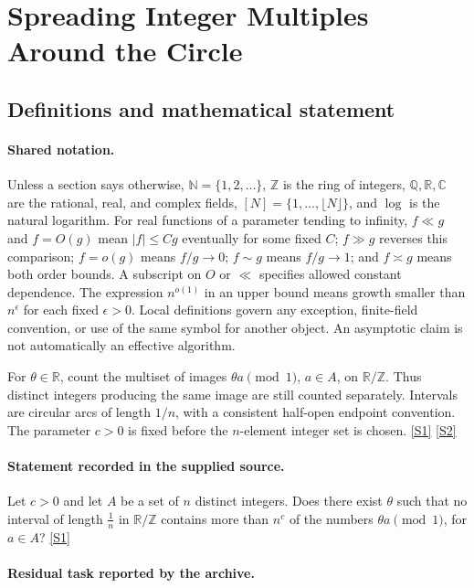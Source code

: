 \documentclass[11pt,a4paper]{article}
\newcommand{\N}{\mathbb{N}}
\newcommand{\Z}{\mathbb{Z}}
\newcommand{\Q}{\mathbb{Q}}
\newcommand{\R}{\mathbb{R}}
\newcommand{\C}{\mathbb{C}}
\newcommand{\sref}[2]{\hyperlink{source:#1:#2}{[S#2]}}
\begin{document}
\section{Spreading Integer Multiples Around the Circle}\label{statement}


\subsection{Definitions and mathematical statement}

\paragraph{Shared notation.}Unless a section says otherwise, $\N=\{1,2,\ldots\}$,
$\Z$ is the ring of integers, $\Q,\R,\C$ are the rational, real, and complex
fields, $[N]=\{1,\ldots,\lfloor N\rfloor\}$, and $\log$ is the natural
logarithm. For real functions of a parameter tending to infinity,
$f\ll g$ and $f=O(g)$ mean $|f|\leq Cg$ eventually for some fixed $C$;
$f\gg g$ reverses this comparison; $f=o(g)$ means $f/g\to0$;
$f\sim g$ means $f/g\to1$; and $f\asymp g$ means both order bounds.
A subscript on $O$ or $\ll$ specifies allowed constant dependence.
The expression $n^{o(1)}$ in an upper bound means growth smaller than
$n^\epsilon$ for each fixed $\epsilon>0$. Local definitions govern any
exception, finite-field convention, or use of the same symbol for another
object. An asymptotic claim is not automatically an effective algorithm.



For $\theta\in\R$, count the multiset of images $\theta a\pmod1$, $a\in A$, on $\R/\Z$. Thus distinct integers producing the same image are still counted separately. Intervals are circular arcs of length $1/n$, with a consistent half-open endpoint convention. The parameter $c>0$ is fixed before the $n$-element integer set is chosen. \sref{statement}{1} \sref{statement}{2}

\paragraph{Statement recorded in the supplied source.}
Let $c > 0$ and let $A$ be a set of $n$ distinct integers. Does there exist $\theta$ such that no interval of length $\frac{1}{n}$ in $\mathbb{R}/\mathbb{Z}$ contains more than $n^c$ of the numbers $\theta a \pmod 1$, for $a \in A$? \sref{statement}{1}

\paragraph{Residual task reported by the archive.}
\end{document}
